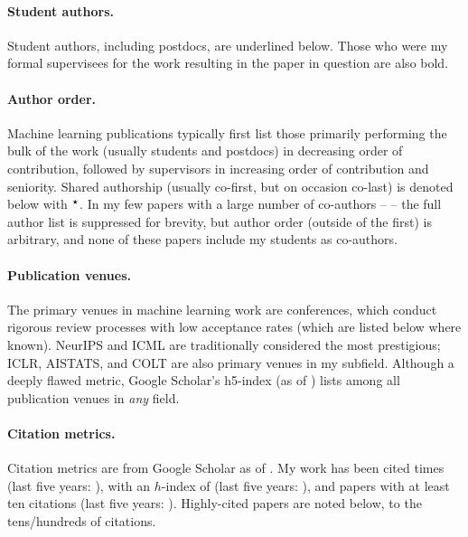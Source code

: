 \documentclass[10pt]{article}
\begin{document}
%

\paragraph{Student authors.}
Student authors, including postdocs, are underlined below.
Those who were my formal supervisees for the work resulting in the paper in question are also bold.

\paragraph{Author order.} Machine learning publications typically first list those primarily performing the bulk of the work (usually students and postdocs) in decreasing order of contribution,
followed by supervisors in increasing order of contribution and seniority.
Shared authorship (usually co-first, but on occasion co-last) is denoted below with $^{\boldsymbol\star}$.
In my few papers with a large number of co-authors -- \lotsoauths{} -- the full author list is suppressed for brevity,
but author order (outside of the first) is arbitrary, and none of these papers include my students as co-authors.

\paragraph{Publication venues.} The primary venues in machine learning work are conferences,
which conduct rigorous review processes with low acceptance rates (which are listed below where known).
NeurIPS and ICML are traditionally considered the most prestigious;
ICLR, AISTATS, and COLT are also primary venues in my subfield.
Although a deeply flawed metric, Google Scholar's h5-index (as of \citeupdatedate{}) lists \hfiveinfo{} among all publication venues in \emph{any} field.

\paragraph{Citation metrics.}
Citation metrics are from Google Scholar as of \citeupdatedate{}.
My work has been cited \totalcites{} times (last five years: \totalcitesrec{}),
with an $h$-index of \hindex{} (last five years: \hindexrec{}),
and \itenindex{} papers with at least ten citations (last five years: \itenindexrec{}).
Highly-cited papers are noted below, to the tens/hundreds of citations.
\end{document}
